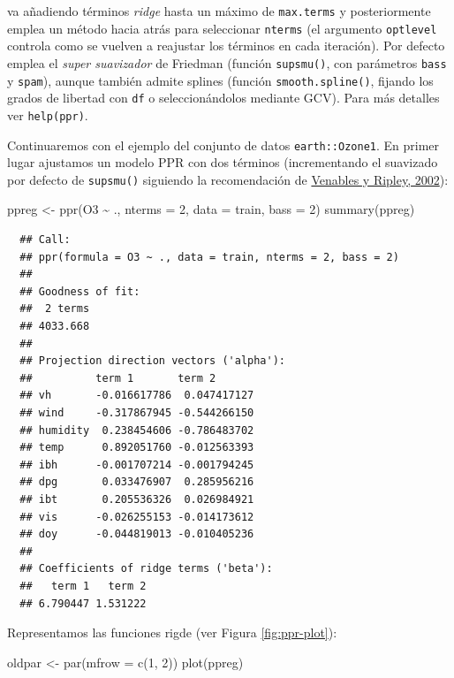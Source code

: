 \documentclass[
]{book}
\newenvironment{Shaded}{\begin{snugshade}}{\end{snugshade}}
\newcommand{\AttributeTok}[1]{\textcolor[rgb]{0.77,0.63,0.00}{#1}}
\newcommand{\DecValTok}[1]{\textcolor[rgb]{0.00,0.00,0.81}{#1}}
\newcommand{\FunctionTok}[1]{\textcolor[rgb]{0.00,0.00,0.00}{#1}}
\newcommand{\NormalTok}[1]{#1}
\newcommand{\OtherTok}[1]{\textcolor[rgb]{0.56,0.35,0.01}{#1}}
\newcommand{\SpecialCharTok}[1]{\textcolor[rgb]{0.00,0.00,0.00}{#1}}
\theoremstyle{break}
\theoremstyle{nonumberplain}
\begin{document}
va añadiendo términos \emph{ridge} hasta un máximo de \texttt{max.terms} y posteriormente emplea un método hacia atrás para seleccionar \texttt{nterms} (el argumento \texttt{optlevel} controla como se vuelven a reajustar los términos en cada iteración).
Por defecto emplea el \emph{super suavizador} de Friedman (función \texttt{supsmu()}, con parámetros \texttt{bass} y \texttt{spam}), aunque también admite splines (función \texttt{smooth.spline()}, fijando los grados de libertad con \texttt{df} o seleccionándolos mediante GCV).
Para más detalles ver \texttt{help(ppr)}.

Continuaremos con el ejemplo del conjunto de datos \texttt{earth::Ozone1}.
En primer lugar ajustamos un modelo PPR con dos términos (incrementando el suavizado por defecto de \texttt{supsmu()} siguiendo la recomendación de \protect\hyperlink{ref-Venables2002Modern}{Venables y Ripley, 2002}):

\begin{Shaded}
\begin{Highlighting}[]
\NormalTok{ppreg }\OtherTok{\textless{}{-}} \FunctionTok{ppr}\NormalTok{(O3 }\SpecialCharTok{\textasciitilde{}}\NormalTok{ ., }\AttributeTok{nterms =} \DecValTok{2}\NormalTok{, }\AttributeTok{data =}\NormalTok{ train, }\AttributeTok{bass =} \DecValTok{2}\NormalTok{)}
\FunctionTok{summary}\NormalTok{(ppreg)}
\end{Highlighting}
\end{Shaded}

\begin{verbatim}
  ## Call:
  ## ppr(formula = O3 ~ ., data = train, nterms = 2, bass = 2)
  ## 
  ## Goodness of fit:
  ##  2 terms 
  ## 4033.668 
  ## 
  ## Projection direction vectors ('alpha'):
  ##          term 1       term 2      
  ## vh       -0.016617786  0.047417127
  ## wind     -0.317867945 -0.544266150
  ## humidity  0.238454606 -0.786483702
  ## temp      0.892051760 -0.012563393
  ## ibh      -0.001707214 -0.001794245
  ## dpg       0.033476907  0.285956216
  ## ibt       0.205536326  0.026984921
  ## vis      -0.026255153 -0.014173612
  ## doy      -0.044819013 -0.010405236
  ## 
  ## Coefficients of ridge terms ('beta'):
  ##   term 1   term 2 
  ## 6.790447 1.531222
\end{verbatim}

Representamos las funciones rigde (ver Figura \ref{fig:ppr-plot}):



\begin{Shaded}
\begin{Highlighting}[]
\NormalTok{oldpar }\OtherTok{\textless{}{-}} \FunctionTok{par}\NormalTok{(}\AttributeTok{mfrow =} \FunctionTok{c}\NormalTok{(}\DecValTok{1}\NormalTok{, }\DecValTok{2}\NormalTok{))}
\FunctionTok{plot}\NormalTok{(ppreg)}
\end{Highlighting}
\end{Shaded}
\end{document}
